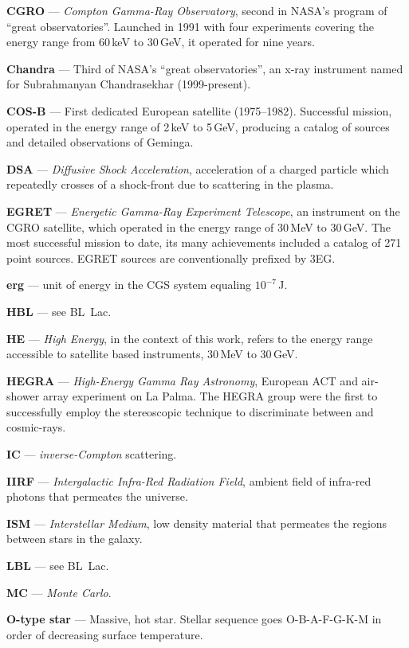 \textbf{CGRO} --- \textit{Compton Gamma-Ray Observatory}, second in
NASA's program of ``great observatories''. Launched in 1991 with four
experiments covering the energy range from 60\,keV to 30\,GeV, it
operated for nine years.

\textbf{Chandra} --- Third of NASA's ``great observatories'', an
x-ray instrument named for Subrahmanyan Chandrasekhar (1999-present).

\textbf{COS-B} --- First dedicated European \Gray satellite (1975--1982).
Successful mission, operated in the energy range of 2\,keV to 5\,GeV, 
producing a catalog of sources and detailed observations of Geminga.

\textbf{DSA} --- \textit{Diffusive Shock Acceleration}, acceleration
of a charged particle which repeatedly crosses of a shock-front due to
scattering in the plasma.

\textbf{EGRET} --- \textit{Energetic Gamma-Ray Experiment Telescope},
an instrument on the CGRO satellite, which operated in the energy
range of 30\,MeV to 30\,GeV. The most successful \Gray mission to date,
its many achievements included a catalog of 271 point sources. EGRET
sources are conventionally prefixed by 3EG.

\textbf{erg} --- unit of energy in the CGS system equaling $10^{-7}$\,J.

\textbf{HBL} --- see BL~Lac.

\textbf{HE} --- \textit{High Energy}, in the context of this work, refers 
to the energy range accessible to satellite based \Gray instruments,
30\,MeV to 30\,GeV.

\textbf{HEGRA} --- \textit{High-Energy Gamma Ray Astronomy}, European
ACT and air-shower array experiment on La Palma. The HEGRA group were
the first to successfully employ the stereoscopic technique to
discriminate between \Grays and cosmic-rays.

\textbf{IC} --- \textit{inverse-Compton} scattering.

\textbf{IIRF} --- \textit{Intergalactic Infra-Red Radiation Field}, 
ambient field of infra-red photons that permeates the universe.

\textbf{ISM} --- \textit{Interstellar Medium}, low density material
that permeates the regions between stars in the galaxy.

\textbf{LBL} --- see BL~Lac.

\textbf{MC} --- \textit{Monte Carlo}.

\textbf{O-type star} --- Massive, hot star. Stellar sequence goes
O-B-A-F-G-K-M in order of decreasing surface temperature.

